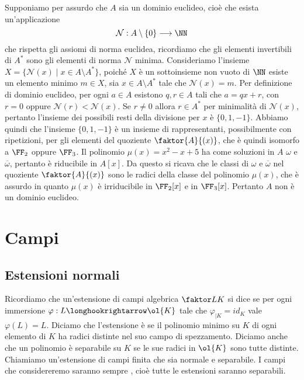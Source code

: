 \documentclass[11pt]{scrartcl}
\begin{document}
Supponiamo per assurdo che $A$ sia un dominio euclideo, cioè che esista
un'applicazione 
\[
    \mathcal{N}: A\setminus \{0\} \longrightarrow \NN
\]
che rispetta gli assiomi di norma euclidea, ricordiamo che gli elementi 
invertibili di $A^*$ sono gli elementi di norma $\mathcal{N}$ minima. 
Consideriamo l'insieme $X = \{\mathcal{N}(x)\mid x \in A\setminus A^*\}$,
poiché $X$ è un sottoinsieme non vuoto di $\NN$ esiste un elemento minimo 
$m \in X$, sia $x \in A\setminus A^*$ tale che $\mathcal{N}(x) = m$.
Per definizione di dominio euclideo, per ogni $a \in A$ esistono $q, r \in A$
tali che $a = qx + r$, con $r = 0$ oppure $\mathcal{N}(r) < \mathcal{N}(x)$.
Se $r \neq 0$ allora $r \in A^*$ per minimalità di $\mathcal{N}(x)$, pertanto 
l'insieme dei possibili resti della divisione per $x$ è $\{0, 1, -1\}$.
Abbiamo quindi che l'insieme $\{0, 1, -1\}$ è un insieme di rappresentanti, 
possibilmente con ripetizioni, per gli elementi del quoziente $\faktor{A}{(x)}$,
che è quindi isomorfo a $\FF_2$ oppure $\FF_3$.\newline
Il polinomio $\mu(x) = x^2 - x + 5$ ha come soluzioni in $A$ $\omega$ e $\overline{\omega}$,
pertanto è riducibile in $A[x]$. Da questo si ricava che le classi di $\omega$
e $\overline{\omega}$ nel quoziente $\faktor{A}{(x)}$ sono le radici della 
classe del polinomio $\mu(x)$, che è assurdo in quanto $\mu(x)$ è irriducibile
in $\FF_2[x]$ e in $\FF_3[x]$. Pertanto $A$ non è un dominio euclideo.

\newpage

\section{Campi}

\subsection{Estensioni normali}

Ricordiamo che un'estensione di campi algebrica $\faktor L K$ si dice 
 se per ogni immersione $\varphi: L\longhookrightarrow \ol{K}$
tale che $\varphi_{\mid K} = id_K$ vale $\varphi(L) = L$. Diciamo che 
l'estensione è  se il polinomio minimo su $K$ di ogni elemento
di $K$ ha radici distinte nel suo campo di spezzamento. Diciamo anche che un 
polinomio è separabile su $K$ se le sue radici in $\ol{K}$ sono tutte distinte. 
Chiamiamo  un'estensione di campi finita che sia 
normale e separabile. I campi che considereremo saranno sempre ,
cioè tutte le estensioni saranno separabili.
\end{document}
